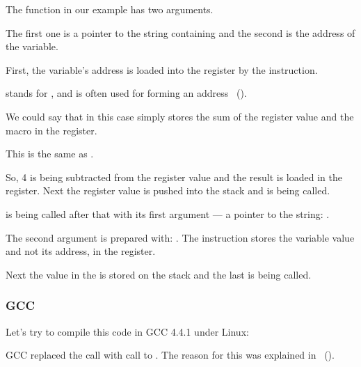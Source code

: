 The \scanf function in our example has two arguments.

The first one is a pointer to the string containing  and the second is the address of the  variable.

First, the  variable's address is loaded into the \EAX register by the  instruction.

\LEA stands for , and is often used for forming an address ~().

We could say that in this case \LEA simply stores the sum of the \EBP register value and the  macro in the \EAX register.

This is the same as .

So, 4 is being subtracted from the \EBP register value and the result is loaded in the \EAX register.
Next the \EAX register value is pushed into the stack and \scanf is being called.

\printf is being called after that with its first argument --- a pointer to the string:
.

The second argument is prepared with: .
The instruction stores the  variable value and not its address, in the \ECX register.

Next the value in the \ECX is stored on the stack and the last \printf is being called.

\ifdefined\IncludeOlly

\fi

\ifdefined\IncludeGCC
\subsubsection{GCC}

Let's try to compile this code in GCC 4.4.1 under Linux:



GCC replaced the \printf call with call to \puts. The reason for this was explained in ~().

% 


